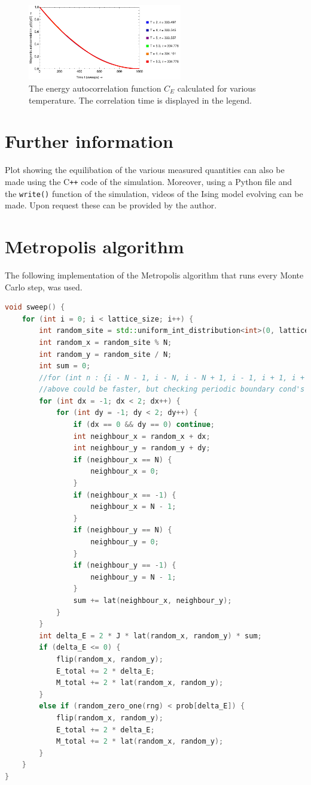 \documentclass[a4paper]{article}
\begin{document}
\begin{figure}[h]
	\centering
	\includegraphics[width=0.6\textwidth]{macimageW.pdf}
	\caption{The energy autocorrelation function $C_E$ calculated for various temperature. The correlation time is displayed in the legend.}
	\label{fig:eac}
\end{figure}


\section{Further information}
Plot showing the equilibation of the various measured quantities can also be made using the C\texttt{++} code of the simulation. Moreover, using a Python file and the \texttt{write()} function of the simulation, videos of the Ising model evolving can be made. Upon request these can be provided by the author.

\printbibliography[heading=bibintoc]
\appendix
\section{Metropolis algorithm}\label{sec:met}
The following implementation of the Metropolis algorithm that runs every Monte Carlo step, was used.

\begin{lstlisting}[language=C++]
void sweep() {
	for (int i = 0; i < lattice_size; i++) {
		int random_site = std::uniform_int_distribution<int>(0, lattice_size - 1)(rng);
		int random_x = random_site % N;
		int random_y = random_site / N;
		int sum = 0;
		//for (int n : {i - N - 1, i - N, i - N + 1, i - 1, i + 1, i + N - 1, i + N, i + N + 1}) {}
		//above could be faster, but checking periodic boundary cond's becomes messy.
		for (int dx = -1; dx < 2; dx++) {
			for (int dy = -1; dy < 2; dy++) {
				if (dx == 0 && dy == 0) continue;
				int neighbour_x = random_x + dx;
				int neighbour_y = random_y + dy;
				if (neighbour_x == N) {
					neighbour_x = 0;
				}
				if (neighbour_x == -1) {
					neighbour_x = N - 1;
				}
				if (neighbour_y == N) {
					neighbour_y = 0;
				}
				if (neighbour_y == -1) {
					neighbour_y = N - 1;
				}
				sum += lat(neighbour_x, neighbour_y);
			}
		}
		int delta_E = 2 * J * lat(random_x, random_y) * sum;
		if (delta_E <= 0) {
			flip(random_x, random_y);
			E_total += 2 * delta_E;
			M_total += 2 * lat(random_x, random_y);
		}
		else if (random_zero_one(rng) < prob[delta_E]) {
			flip(random_x, random_y);
			E_total += 2 * delta_E;
			M_total += 2 * lat(random_x, random_y);
		}
	}
}
\end{lstlisting}
\end{document}
